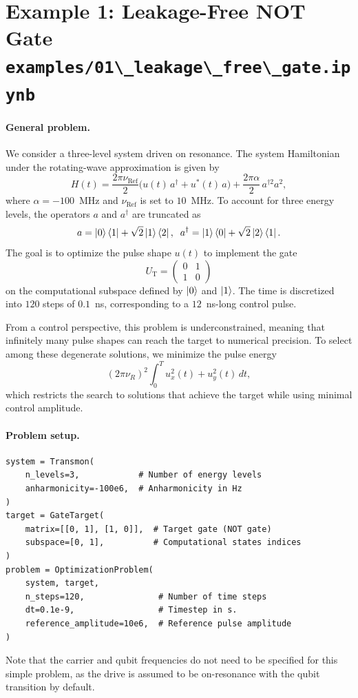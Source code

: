 \documentclass[a4paper,12pt]{article}
\DeclareMathOperator{\R}{Ref}
\newcommand{\mcode}[1]{\protect\lstinline[basicstyle=\color{black}\ttfamily]!#1!}
\begin{document}
\newpage
\section*{Example 1: Leakage-Free NOT Gate\\ \mcode{examples/01\_leakage\_free\_gate.ipynb}}
{}

\paragraph*{General problem.}
We consider a three-level system driven on resonance.
The system Hamiltonian under the rotating-wave approximation is given by
\[
    H(t) = \frac{2\pi \nu_{\R}}{2}\big( u(t) \, a^{\dagger} + u^{*}(t) \, a \big)
         + \frac{2\pi \alpha}{2} \, a^{\dagger 2} a^{2},
\]
where $\alpha=-100$~MHz and $\nu_{\R}$ is set to $10$~MHz.
To account for three energy levels, the operators $a$ and $a^{\dagger}$ are truncated as
\[
    a = \ket{0}\bra{1} + \sqrt{2}\ket{1}\bra{2},
    \;\;
    a^{\dagger} = \ket{1}\bra{0} + \sqrt{2}\ket{2}\bra{1}.
\]
The goal is to optimize the pulse shape $u(t)$ to implement the gate
\[
    U_{\mathrm{T}} = \begin{pmatrix}
        0 & 1 \\
        1 & 0
    \end{pmatrix}
\]
on the computational subspace defined by $\ket{0}$ and $\ket{1}$.
The time is discretized into $120$ steps of $0.1$~ns, corresponding to a $12$~ns-long control pulse.

From a control perspective, this problem is underconstrained, meaning that
infinitely many pulse shapes can reach the target to numerical precision. To
select among these degenerate solutions, we minimize the pulse energy
\[(2\pi\nu_R)^2\int_0^T  u_x^2(t)+u_y^2(t)\,dt,\]
which restricts the search to solutions that achieve the target while using
minimal control amplitude.

\paragraph*{Problem setup.}
\begin{lstlisting}
system = Transmon(
    n_levels=3,            # Number of energy levels
    anharmonicity=-100e6,  # Anharmonicity in Hz
)
target = GateTarget(
    matrix=[[0, 1], [1, 0]],  # Target gate (NOT gate)
    subspace=[0, 1],          # Computational states indices
)
problem = OptimizationProblem(
    system, target,
    n_steps=120,               # Number of time steps
    dt=0.1e-9,                 # Timestep in s.
    reference_amplitude=10e6,  # Reference pulse amplitude
)
\end{lstlisting}
Note that the carrier and qubit frequencies do not need to be specified for
this simple problem, as the drive is assumed to be on-resonance with the
qubit transition by default.
\end{document}
